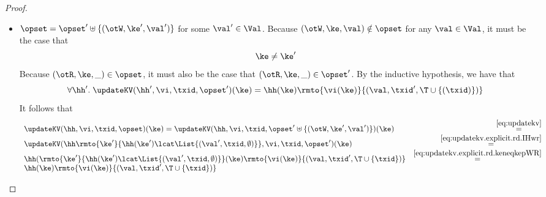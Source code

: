 \begin{proof}
\begin{enumerate}
\begin{itemize}
		\item $\opset = \opset' \uplus \{(\otW, \ke', \val')\}$ for some $\val' \in \Val$. Because $(\otW, \ke, \val) \notin \opset$ 
		for any $\val \in \Val$, it must be the case that 
		\begin{equation}
		\ke \neq \ke'
		\label{eq:updatekv.explicit.rd.keneqkepWR}
		\end{equation}
		Because $(\otR, \ke, \_) \in \opset$, it must also be the case that $(\otR, \ke, \_) \in \opset'$. By the inductive hypothesis, 
		we have that 
		\begin{equation}
		\forall \hh'.\;\updateKV(\hh', \vi,\txid, \opset')(\ke) = \hh(\ke)\rmto{\vi(\ke)}{(\val, \txid', \T \cup \{(\txid)\})}
		\label{eq:updatekv.explicit.rd.IHwr}
		\end{equation}
		It follows that 
		\[
		\begin{array}{lr}
		\updateKV(\hh, \vi, \txid, \opset)(\ke) = \updateKV(\hh, \vi, \txid, \opset' \uplus \{(\otW, \ke', \val')\})(\ke) &\stackrel{\eqref{eq:updatekv}}{=}\\
		\updateKV(\hh\rmto{\ke'}{\hh(\ke') \lcat \List{(\val', \txid, \emptyset)}}, \vi, \txid, \opset')(\ke) &\stackrel{\eqref{eq:updatekv.explicit.rd.IHwr}}{=}\\
		\hh(\rmto{\ke'}{\hh(\ke') \lcat \List{(\val', \txid, \emptyset)}}(\ke)\rmto{\vi(\ke)}{(\val, \txid', \T \cup \{\txid\})} &
		\stackrel{\eqref{eq:updatekv.explicit.rd.keneqkepWR}}{=}\\
		\hh(\ke)\rmto{\vi(\ke)}{(\val, \txid', \T \cup \{\txid\})}
		\end{array}
		\]
	\end{itemize}
	

\end{enumerate}
\end{proof}

